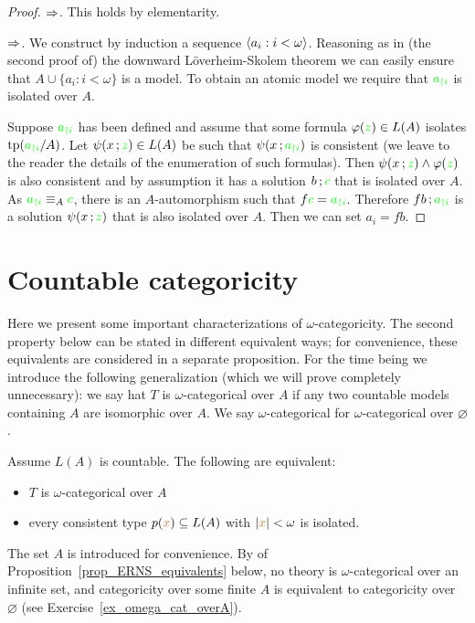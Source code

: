 \vspace*{-\parskip}
\begin{proof}
$\Rightarrow$. This holds by elementarity.

$\Rightarrow$. We construct by induction a sequence $\langle{a_i}:i<\omega\rangle$.
Reasoning as in (the second proof of) the downward L\"overheim-Skolem theorem we can easily ensure that $A\cup\big\{{a_i}:i<\omega\big\}$ is a model.
To obtain an atomic model we require that ${\color{green} a_{\restriction i}}$ is isolated over $A$.


Suppose ${\color{green} a_{\restriction i}}$ has been defined and assume that some formula $\varphi({\color{green} z})\in L(A)$ isolates ${\rm tp}({\color{green} a_{\restriction i}}/A)$.
Let $\psi({x}\,;{\color{green} z})\in L(A)$ be such that $\psi({x}\,;{\color{green} a_{\restriction i}})$ is consistent (we leave to the reader the details of the enumeration of such formulas).
Then $\psi({x}\,;{\color{green} z})\wedge\varphi({\color{green} z})$ is also consistent and by assumption it has a solution ${b}\,;{\color{green} c}$ that is isolated over $A$.
As ${\color{green} a_{\restriction i}}\equiv_A{\color{green} c}$, there is an $A$-automorphism such that $f{\color{green} c}={\color{green} a_{\restriction i}}$.
Therefore $f{b}\,;{\color{green} a_{\restriction i}}$ is a solution $\psi({x}\,;{\color{green} z})$ that is also isolated over $A$.
Then we can set ${a_i}=f{b}$.
\end{proof}


\section{Countable categoricity}

Here we present some important characterizations of $\omega$-categoricity.
The second property below can be stated in different equivalent ways; for convenience, these equivalents are considered in a separate proposition.
For the time being we introduce the following generalization (which we will prove completely unnecessary): we say hat $T$ is $\omega$-categorical over $A$ if any two countable models containing $A$ are isomorphic over $A$.
We say $\omega$-categorical for $\omega$-categorical over $\varnothing$.

\begin{theorem} Assume $L(A)$ is countable.
The following are equivalent:
\begin{itemize}   
\item[1.] $T$ is $\omega$-categorical over $A$
\item[2.] every consistent type $p({\color{brown} x})\subseteq L(A)$ with $|{\color{brown} x}|<\omega$ is isolated.

\end{itemize}
\end{theorem}
The set $A$ is introduced for convenience.
By  of Proposition~\ref{prop_ERNS_equivalents} below, no theory is $\omega$-categorical over an infinite set, and categoricity over some finite $A$ is equivalent to categoricity over $\varnothing$ (see Exercise~\ref{ex_omega_cat_overA}).

